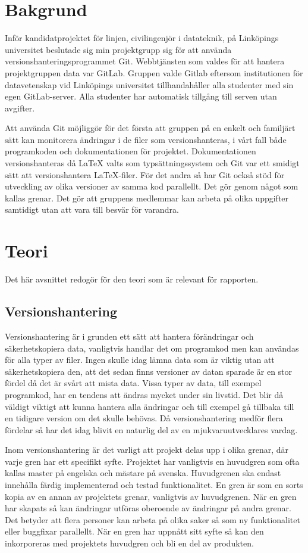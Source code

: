 \clearpage
\section{Bakgrund}
Inför kandidatprojektet för linjen, civilingenjör i datateknik, på Linköpings universitet beslutade sig min projektgrupp sig för att använda versionshanteringsprogrammet Git.
Webbtjänsten som valdes för att hantera projektgruppen data var GitLab. Gruppen valde Gitlab eftersom institutionen för datavetenskap vid Linköpings universitet tillhandahåller alla studenter med sin egen GitLab-server. Alla studenter har automatisk tillgång till serven utan avgifter.

Att använda Git möjliggör för det första att gruppen på en enkelt och familjärt sätt kan monitorera ändringar i de filer som versionshanteras, i vårt fall både programkoden och dokumentationen för projektet. Dokumentationen versionshanteras då LaTeX valts som typsättningssystem och Git var ett smidigt sätt att versionshantera LaTeX-filer. För det andra så har Git också stöd för utveckling av olika versioner av samma kod parallellt. Det gör genom något som kallas grenar. Det gör att gruppens medlemmar kan arbeta på olika uppgifter samtidigt utan att vara till besvär för varandra.


\section{Teori}
Det här avsnittet redogör för den teori som är relevant för rapporten.
\subsection{Versionshantering}
Versionshantering är i grunden ett sätt att hantera förändringar och säkerhetskopiera data, vanligtvis handlar det om programkod men kan användas för alla typer av filer. Ingen skulle idag lämna data som är viktig utan att säkerhetskopiera den, att det sedan finns versioner av datan sparade är en stor fördel då det är svårt att mista data. Vissa typer av data, till exempel programkod, har en tendens att ändras mycket under sin livstid. Det blir då väldigt viktigt att kunna hantera alla ändringar och till exempel gå tillbaka till en tidigare version om det skulle behövas. Då versionshantering medför flera fördelar så har det idag blivit en naturlig del av en mjukvaruutvecklares vardag.\cite{VersionControlGit}

Inom versionshantering är det varligt att projekt delas upp i olika grenar, där varje gren har ett specifikt syfte. Projektet har vanligtvis en huvudgren som ofta kallas master på engelska och mästare på svenska. Huvudgrenen ska endast innehålla färdig implementerad och testad funktionalitet.
En gren är som en sorts kopia av en annan av projektets grenar, vanligtvis av huvudgrenen. När en gren har skapats så kan ändringar utföras oberoende av ändringar på andra grenar. Det betyder att flera personer kan arbeta på olika saker så som ny funktionalitet eller buggfixar parallellt. När en gren har uppnått sitt syfte så kan den inkorporeras med projektets huvudgren och bli en del av produkten.

